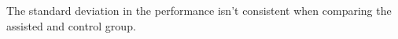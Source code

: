 \documentclass{article}
\begin{document}
\begin{multicols}{2}
The standard deviation in the performance isn't consistent when comparing the assisted and control group. 


\end{multicols}
\end{document}
